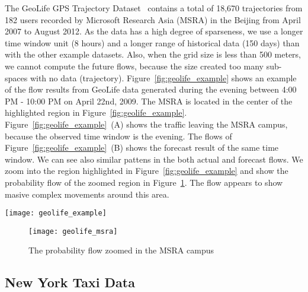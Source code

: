 The GeoLife GPS Trajectory Dataset~\cite{Zheng:2009:Mining} contains a total of 18,670 trajectories from 182 users recorded by Microsoft Research Asia (MSRA) in the Beijing from April 2007 to August 2012.
As the data has a high degree of sparseness, we use a longer time window unit (8 hours) and a longer range of historical data (150 days) than with the other example datasets.
Also, when the grid size is less than 500 meters, we cannot compute the future flows, because the size created too many sub-spaces with no data (trajectory).
Figure~\ref{fig:geolife_example} shows an example of the flow results from GeoLife data generated during the evening between 4:00 PM - 10:00 PM on April 22nd, 2009.
The MSRA is located in the center of the highlighted region in Figure~\ref{fig:geolife_example}.
Figure~\ref{fig:geolife_example}~(A) shows the traffic leaving the MSRA campus, because the observed time window is the evening.
The flows of Figure~\ref{fig:geolife_example}~(B) shows the forecast result of the same time window.
We can see also similar pattens in the both actual and forecast flows.
We zoom into the region highlighted in Figure~\ref{fig:geolife_example} and show the probability flow of the zoomed region in Figure~\ref{fig:geolife_msra}.
The flow appears to show masive complex movements around this area.

\begin{figure*}[tb]
	\centering
	\texttt{[image: geolife\_example]}
	\caption{Flow around the MSRA campus located in the center of the highlighted region. It shows the major flow from GeoLife data during the evening between 4:00 PM - 10:00 PM on April 22nd, 2009. Actual Flow (A) and Forecast Flow (B)}
	\label{fig:geolife_example}
\end{figure*}


\begin{figure}[tb]
	\centering
	\texttt{[image: geolife\_msra]}
	\caption{The probability flow zoomed in the MSRA campus}
	\label{fig:geolife_msra}
\end{figure}


\subsection{New York Taxi Data}

